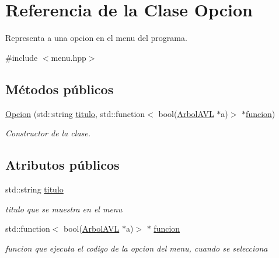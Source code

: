 \hypertarget{classOpcion}{}\section{Referencia de la Clase Opcion}
\label{classOpcion}


Representa a una opcion en el menu del programa.  




{\ttfamily \#include $<$menu.\+hpp$>$}

\subsection*{Métodos públicos}
\begin{DoxyCompactItemize}
\item 
\hyperlink{classOpcion_aca1ec1590d4a27e91615ec8af53d2824}{Opcion} (std\+::string \hyperlink{classOpcion_a1d02b7f92549a27f96d434111ede0056}{titulo}, std\+::function$<$ bool(\hyperlink{classArbolAVL}{Arbol\+A\+VL} $\ast$a)$>$ $\ast$\hyperlink{classOpcion_a11149c2d9df3732dfb83727f9df76f05}{funcion})
\begin{DoxyCompactList}\small\item\em Constructor de la clase. \end{DoxyCompactList}\end{DoxyCompactItemize}
\subsection*{Atributos públicos}
\begin{DoxyCompactItemize}
\item 
\mbox{\label{classOpcion_a1d02b7f92549a27f96d434111ede0056}} 
std\+::string \hyperlink{classOpcion_a1d02b7f92549a27f96d434111ede0056}{titulo}
\begin{DoxyCompactList}\small\item\em titulo que se muestra en el menu \end{DoxyCompactList}\item 
\mbox{\label{classOpcion_a11149c2d9df3732dfb83727f9df76f05}} 
std\+::function$<$ bool(\hyperlink{classArbolAVL}{Arbol\+A\+VL} $\ast$a)$>$ $\ast$ \hyperlink{classOpcion_a11149c2d9df3732dfb83727f9df76f05}{funcion}
\begin{DoxyCompactList}\small\item\em funcion que ejecuta el codigo de la opcion del menu, cuando se selecciona \end{DoxyCompactList}\end{DoxyCompactItemize}



